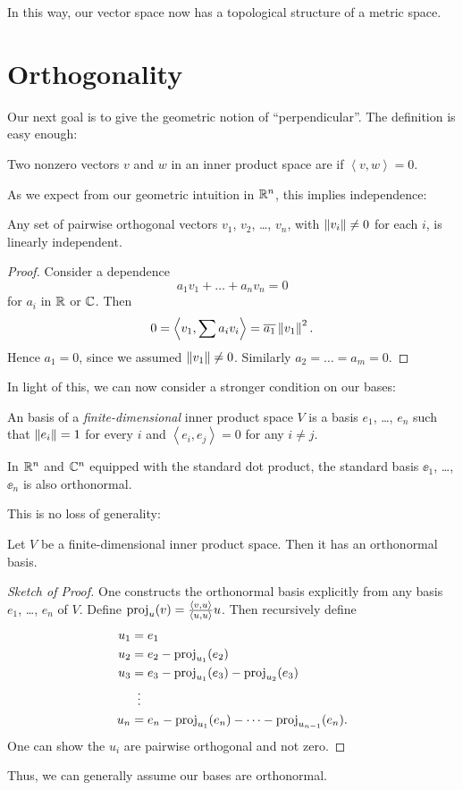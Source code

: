 In this way, our vector space now has a topological structure of a metric space.

\section{Orthogonality}
Our next goal is to give the geometric notion of ``perpendicular''.
The definition is easy enough:
\begin{definition}
	Two nonzero vectors $v$ and $w$ in an inner product space
	are  if $\left< v,w \right> = 0$.
\end{definition}

As we expect from our geometric intuition in $\mathbb R^n$,
this implies independence:
\begin{lemma}
	Any set of pairwise orthogonal vectors $v_1$, $v_2$, \dots, $v_n$,
	with $\left\lVert v_i \right\rVert \ne 0$ for each $i$,
	is linearly independent.
\end{lemma}
\begin{proof}
	Consider a dependence
	\[ a_1 v_1 + \dots + a_n v_n = 0 \]
	for $a_i$ in $\mathbb R$ or $\mathbb C$.
	Then \[ 0 = \left< v_1, \sum a_i v_i \right> = \overline{a_1} \left\lVert v_1 \right\rVert^2. \]
	Hence $a_1 = 0$, since we assumed $\left\lVert v_1 \right\rVert \neq 0$.
	Similarly $a_2 = \dots = a_m = 0$.
\end{proof}

In light of this, we can now consider a stronger condition on our bases:
\begin{definition}
	An  basis of a
	\emph{finite-dimensional} inner product space $V$
	is a basis $e_1$, \dots, $e_n$ such that
	$\left\lVert e_i \right\rVert = 1$ for every $i$ and
	$\left< e_i, e_j \right> = 0$ for any $i \neq j$.
\end{definition}
\begin{example}
	In $\mathbb R^n$ and $\mathbb C^n$ equipped with the standard dot product,
	the standard basis $\ee_1$, \dots, $\ee_n$ is also orthonormal.
\end{example}
This is no loss of generality:
\begin{theorem}
	Let $V$ be a finite-dimensional inner product space.
	Then it has an orthonormal basis.
\end{theorem}
\begin{proof}[Sketch of Proof]
	One constructs the orthonormal basis explicitly from any basis
	$e_1$, \dots, $e_n$ of $V$.
	Define $\operatorname{proj}_u(v) = \frac{\left< v,u\right>}{\left< u,u\right>} u$.
	Then recursively define
	\begin{align*}
		u_1 &= e_1 \\
		u_2 &= e_2 - \opname{proj}_{u_1}(e_2) \\
		u_3 &= e_3 - \opname{proj}_{u_1}(e_3) - \opname{proj}_{u_2}(e_3) \\
		&\vdotswithin{=} \\
		u_n &= e_n - \opname{proj}_{u_1}(e_n) - \dots - \opname{proj}_{u_{n-1}}(e_n).
	\end{align*}
	One can show the $u_i$ are pairwise orthogonal and not zero.
\end{proof}
Thus, we can generally assume our bases are orthonormal.

